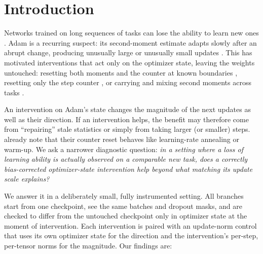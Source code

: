 \section{Introduction}
\label{sec:intro}

Networks trained on long sequences of tasks can lose the ability to learn new ones
\citep{dohare2024loss,lyle2023understanding}. Adam \citep{kingma2015adam} is a recurring suspect: its
second-moment estimate adapts slowly after an abrupt change, producing unusually large or unusually small
updates \citep{lyle2023understanding,dohare2024loss,ellis2024adam}. This has motivated interventions that
act only on the optimizer state, leaving the weights untouched: resetting both moments and the counter at
known boundaries \citep{asadi2023resetting}, resetting only the step counter \citep{ellis2024adam}, or
carrying and mixing second moments across tasks \citep{kang2024continual}.

An intervention on Adam's state changes the magnitude of the next updates as well as their direction.
If an intervention helps, the benefit may therefore come from ``repairing'' stale statistics or simply
from taking larger (or smaller) steps. \citet{ellis2024adam} already note that their counter reset
behaves like learning-rate annealing or warm-up. We ask a narrower diagnostic question:
\emph{in a setting where a loss of learning ability is actually observed on a comparable new task, does a
correctly bias-corrected optimizer-state intervention help beyond what matching its update scale explains?}

We answer it in a deliberately small, fully instrumented setting. All branches start from one checkpoint,
see the same batches and dropout masks, and are checked to differ from the untouched checkpoint only in
optimizer state at the moment of intervention. Each intervention is paired with an update-norm control
that uses its own optimizer state for the direction and the intervention's per-step, per-tensor norms
for the magnitude. Our findings are:


